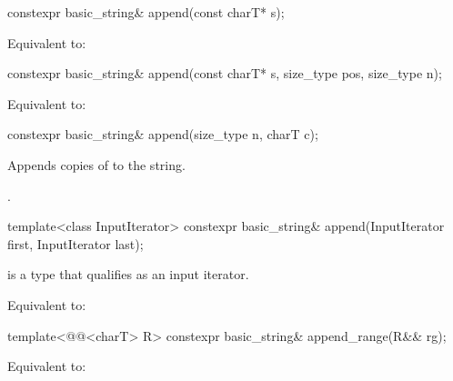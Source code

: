 %
\begin{itemdecl}
constexpr basic_string& append(const charT* s);
\end{itemdecl}

\begin{itemdescr}
\pnum
\effects
Equivalent to: 
\end{itemdescr}

%
\begin{itemdecl}
constexpr basic_string& append(const charT* s, size_type pos, size_type n);
\end{itemdecl}

\begin{itemdescr}
\pnum
\effects
Equivalent to:
\end{itemdescr}

%
\begin{itemdecl}
constexpr basic_string& append(size_type n, charT c);
\end{itemdecl}

\begin{itemdescr}
\pnum
\effects
Appends  copies of  to the string.

\pnum
\returns
{}.
\end{itemdescr}

%
\begin{itemdecl}
template<class InputIterator>
  constexpr basic_string& append(InputIterator first, InputIterator last);
\end{itemdecl}

\begin{itemdescr}
\pnum
\constraints
{} is a type that qualifies as an input
iterator.

\pnum
\effects
Equivalent to: 
\end{itemdescr}

%
\begin{itemdecl}
template<@@<charT> R>
  constexpr basic_string& append_range(R&& rg);
\end{itemdecl}

\begin{itemdescr}
\pnum
\effects
Equivalent to: 
\end{itemdescr}

